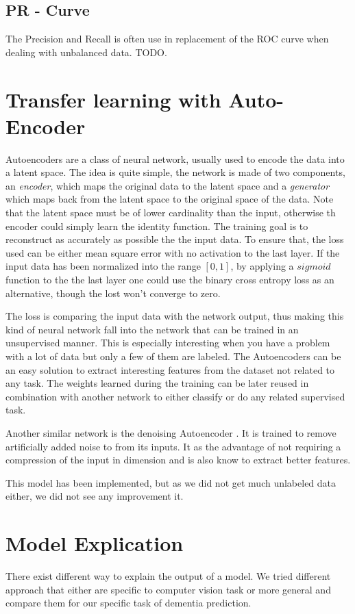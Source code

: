 \subsection{PR - Curve}
The Precision and Recall is often use in replacement of the ROC curve when dealing with unbalanced data. TODO.


\section{Transfer learning with Auto-Encoder}
Autoencoders are a class of neural network, usually used to encode the data into a latent space. The idea is quite simple, the network is made of two components, an \textit{encoder}, which maps the original data to the latent space and a \textit{generator} which maps back from the latent space to the original space of the data. Note that the latent space must be of lower cardinality than the input, otherwise th encoder could simply learn the identity function. The training goal is to reconstruct as accurately as possible the the input data. To ensure that, the loss used can be either mean square error with no activation to the last layer. If the input data has been normalized into the range $[0, 1]$, by applying a $sigmoid$ function to the the last layer one could use the binary cross entropy loss as an alternative, though the lost won’t converge to zero. 

The loss is comparing the input data with the network output, thus making this kind of neural network fall into the network that can be trained in an unsupervised manner. This is especially interesting when you have a problem with a lot of data but only a few of them are labeled. The Autoencoders can be an easy solution to extract interesting features from the dataset not related to any task. The weights learned during the training can be later reused in combination with another network to either classify or do any related supervised task.

Another similar network is the denoising Autoencoder \cite{denoising_autoencoder_10.5555/1756006.1953039}. It is trained to remove artificially added noise to from its inputs. It as the advantage of not requiring a compression of the input in dimension and is also know to extract better features.

This model has been implemented, but as we did not get much unlabeled data either, we did not see any improvement it.

\section{Model Explication}
There exist different way to explain the output of a model. We tried different approach that either are specific to computer vision task or more general and compare them for our specific task of dementia prediction.

